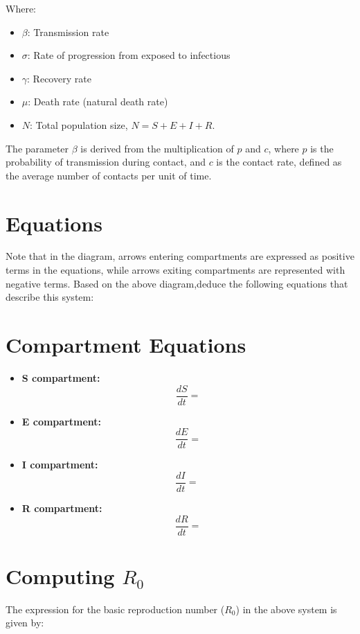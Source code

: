 \documentclass{article}
\begin{document}
Where:
\begin{itemize}
    \item \( \beta \): Transmission rate
    \item \( \sigma \): Rate of progression from exposed to infectious
    \item \( \gamma \): Recovery rate
    \item \( \mu \): Death rate (natural death rate)
    \item \( N \): Total population size, \( N = S + E + I + R \).
\end{itemize}

 The parameter $\beta$ is derived from the multiplication of $p$
  and $c$, where $p$ is the probability of transmission during contact, and $c$ 
  is the contact rate, defined as the average number of contacts per unit of time. 

\section{Equations}\label{eqs}
Note that in the diagram, arrows entering compartments are expressed as positive 
terms in the equations, while arrows exiting compartments are represented with negative terms.
Based on the above diagram,deduce the following equations that describe this system:

\section*{Compartment Equations}

\begin{itemize}
    \item \textbf{S compartment:}
    \[
    \frac{dS}{dt} = 
    \]
    
    \item \textbf{E compartment:}
    \[
    \frac{dE}{dt} = 
    \]
    \item \textbf{I compartment:}
    \[
    \frac{dI}{dt} = \
    \]
    
    \item \textbf{R compartment:}
    \[
    \frac{dR}{dt} =
    \]
\end{itemize}

\section{Computing $R_0$}
The expression for the basic reproduction number ($R_0$) in the above system  is given by:
\end{document}
